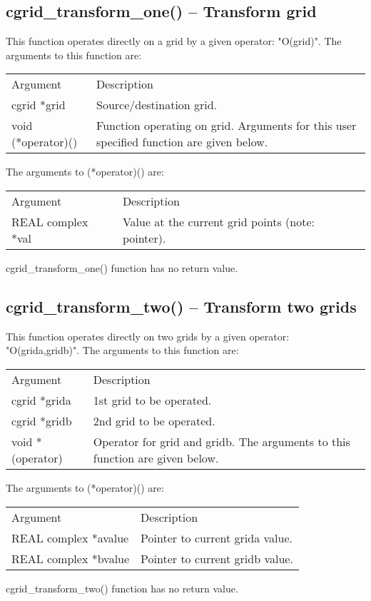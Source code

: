 \documentclass[12pt,letterpaper]{report}
\begin{document}
\subsection{cgrid\_transform\_one() -- Transform grid}

This function operates directly on a grid by a given operator:  "O(grid)". The arguments to this function are:
\begin{longtable}{p{} p{}}
Argument & Description\\
\cline{1-2}
cgrid *grid & Source/destination grid.\\
void (*operator)() & Function operating on grid. Arguments for this user specified function are given below.\\
\end{longtable}
The arguments to (*operator)() are:
\begin{longtable}{p{} p{}}
Argument & Description\\
\cline{1-2}
REAL complex *val & Value at the current grid points (note: pointer).\\
\end{longtable}
\noindent
cgrid\_transform\_one() function has no return value.

\subsection{cgrid\_transform\_two() -- Transform two grids}

This function operates directly on two grids by a given operator: "O(grida,gridb)". The arguments to this function are:
\begin{longtable}{p{} p{}}
Argument & Description\\
\cline{1-2}
cgrid *grida & 1st grid to be operated.\\
cgrid *gridb & 2nd grid to be operated.\\
void *(operator) & Operator for grid and gridb. The arguments to this function are given below.\\
\end{longtable}
\noindent
The arguments to (*operator)() are:
\begin{longtable}{p{} p{}}
Argument & Description\\
\cline{1-2}
REAL complex *avalue & Pointer to current grida value.\\
REAL complex *bvalue & Pointer to current gridb value.\\
\end{longtable}
\noindent
cgrid\_transform\_two() function has no return value.
\end{document}
